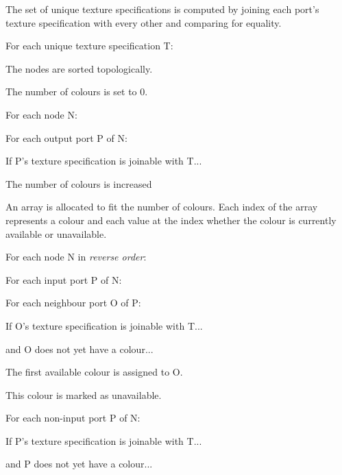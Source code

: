 \documentclass[format=sigconf]{acmart}
\begin{document}
\begin{step}
\item The set of unique texture specifications is computed by joining each port's texture specification with every other and comparing for equality.
\item For each unique texture specification T:
  \begin{step}
  \item The nodes are sorted topologically.
  \item The number of colours is set to 0.
  \item For each node N:
    \begin{step}
    \item For each output port P of N:
      \begin{step}
      \item If P's texture specification is joinable with T...
      \item The number of colours is increased
      \end{step}
    \end{step}
  \item An array is allocated to fit the number of colours. Each index of the array represents a colour and each value at the index whether the colour is currently available or unavailable.
  \item For each node N in \emph{reverse order}:
    \begin{step}
    \item For each input port P of N:
      \begin{step}
      \item For each neighbour port O of P:
        \begin{step}
        \item If O's texture specification is joinable with T...
        \item and O does not yet have a colour...
        \item The first available colour is assigned to O.
        \item This colour is marked as unavailable.
        \end{step}
      \end{step}
    \item For each non-input port P of N:
      \begin{step}
      \item If P's texture specification is joinable with T...
      \item and P does not yet have a colour...

\end{step}
\end{step}
\end{step}
\end{step}
\end{document}
